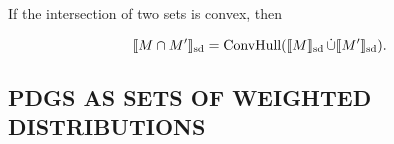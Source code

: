 \documentclass{article}
\newcommand\SD{_{\text{sd}}}
\newcommand{\MN}{PDG}
\numberwithin{equation}{section}
\begin{document}
\begin{notfocus}
{}
	\begin{vfull}
	If the intersection of two sets is convex, then 
	\begin{conj}\label{prop:intersect-set-semantics}
		$$\bbr{M \cap M'}\SD = \text{ConvHull}(\bbr{M}\SD \mathop{\dot\cup} \bbr{M'}\SD).$$
	\end{conj}
	\end{vfull}
	






        	\subsection{\MN S AS SETS OF WEIGHTED
          DISTRIBUTIONS} \label{sec:weighted-semantics} 
	

\end{notfocus}
\end{document}
